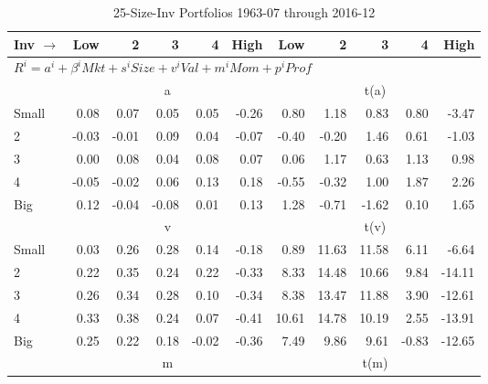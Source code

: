 
\begin{table}[!ht]
\footnotesize
\centering
\caption{25-Size-Inv Portfolios 1963-07 through 2016-12}
\begin{tabular}{lrrrrrrrrrr}
  \toprule
    Inv $\rightarrow$ & Low & 2 & 3 & 4 & High & Low & 2 & 3 & 4 & High \\ 
  \midrule
  \multicolumn{11}{l}{$R^i=a^i+\beta^iMkt+s^iSize+v^iVal+m^iMom+p^iProf$} \\

  
    
      & \multicolumn{5}{c}{a} & \multicolumn{5}{c}{t(a)}
    
    \\
      \cmidrule(r){2-6} \cmidrule(r){7-11}

    Small   & 0.08  & 0.07  & 0.05  & 0.05  & -0.26  & 0.80  & 1.18  & 0.83  & 0.80  & -3.47  \\
         2  & -0.03  & -0.01  & 0.09  & 0.04  & -0.07  & -0.40  & -0.20  & 1.46  & 0.61  & -1.03  \\
         3  & 0.00  & 0.08  & 0.04  & 0.08  & 0.07  & 0.06  & 1.17  & 0.63  & 1.13  & 0.98  \\
         4  & -0.05  & -0.02  & 0.06  & 0.13  & 0.18  & -0.55  & -0.32  & 1.00  & 1.87  & 2.26  \\
    Big     & 0.12  & -0.04  & -0.08  & 0.01  & 0.13  & 1.28  & -0.71  & -1.62  & 0.10  & 1.65  \\

  
    
      & \multicolumn{5}{c}{v} & \multicolumn{5}{c}{t(v)}
    
    \\
      \cmidrule(r){2-6} \cmidrule(r){7-11}

    Small   & 0.03  & 0.26  & 0.28  & 0.14  & -0.18  & 0.89  & 11.63  & 11.58  & 6.11  & -6.64  \\
         2  & 0.22  & 0.35  & 0.24  & 0.22  & -0.33  & 8.33  & 14.48  & 10.66  & 9.84  & -14.11  \\
         3  & 0.26  & 0.34  & 0.28  & 0.10  & -0.34  & 8.38  & 13.47  & 11.88  & 3.90  & -12.61  \\
         4  & 0.33  & 0.38  & 0.24  & 0.07  & -0.41  & 10.61  & 14.78  & 10.19  & 2.55  & -13.91  \\
    Big     & 0.25  & 0.22  & 0.18  & -0.02  & -0.36  & 7.49  & 9.86  & 9.61  & -0.83  & -12.65  \\

  
    
      & \multicolumn{5}{c}{m} & \multicolumn{5}{c}{t(m)}
    

\end{tabular}
\end{table}
